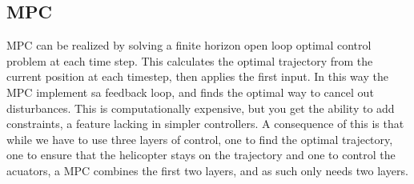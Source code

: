 \subsection{MPC}
MPC can be realized by solving a finite horizon open loop optimal control problem at each time step. This calculates the optimal trajectory from the current position at each timestep, then applies the first input. In this way the MPC implement sa feedback loop, and finds the optimal way to cancel out disturbances. This is computationally expensive, but you get the ability to add constraints, a feature lacking in simpler controllers. A consequence of this is that while we have to use three layers of control, one to find the optimal trajectory, one to ensure that the helicopter stays on the trajectory and one to control the acuators, a MPC combines the first two layers, and as such only needs two layers. 

%
%
